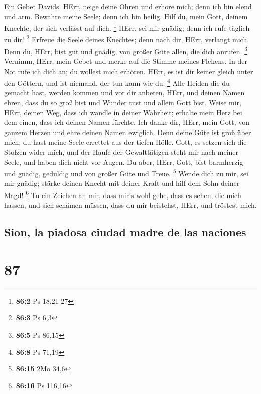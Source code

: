  Ein Gebet Davids. HErr, neige deine Ohren und erhöre
mich; denn ich bin elend und arm.  Bewahre meine Seele;
denn ich bin heilig. Hilf du, mein Gott, deinem Knechte, der sich
verlässt auf dich. \footnote{\textbf{86:2} Ps 18,21-27} 
HErr, sei mir gnädig; denn ich rufe täglich zu dir! \footnote{\textbf{86:3}
  Ps 6,3}  Erfreue die Seele deines Knechtes; denn nach
dir, HErr, verlangt mich.  Denn du, HErr, bist gut und
gnädig, von großer Güte allen, die dich anrufen. \footnote{\textbf{86:5}
  Ps 86,15}  Vernimm, HErr, mein Gebet und merke auf die
Stimme meines Flehens.  In der Not rufe ich dich an; du
wollest mich erhören.  HErr, es ist dir keiner gleich
unter den Göttern, und ist niemand, der tun kann wie du. \footnote{\textbf{86:8}
  Ps 71,19}  Alle Heiden die du gemacht hast, werden
kommen und vor dir anbeten, HErr, und deinen Namen ehren,
 dass du so groß bist und Wunder tust und allein Gott
bist.  Weise mir, HErr, deinen Weg, dass ich wandle in
deiner Wahrheit; erhalte mein Herz bei dem einen, dass ich deinen Namen
fürchte.  Ich danke dir, HErr, mein Gott, von ganzem
Herzen und ehre deinen Namen ewiglich.  Denn deine Güte
ist groß über mich; du hast meine Seele errettet aus der tiefen Hölle.
 Gott, es setzen sich die Stolzen wider mich, und der
Haufe der Gewalttätigen steht mir nach meiner Seele, und haben dich
nicht vor Augen.  Du aber, HErr, Gott, bist barmherzig
und gnädig, geduldig und von großer Güte und Treue. \footnote{\textbf{86:15}
  2Mo 34,6}  Wende dich zu mir, sei mir gnädig; stärke
deinen Knecht mit deiner Kraft und hilf dem Sohn deiner Magd!
\footnote{\textbf{86:16} Ps 116,16}  Tu ein Zeichen an
mir, dass mir's wohl gehe, dass es sehen, die mich hassen, und sich
schämen müssen, dass du mir beistehst, HErr, und tröstest mich.

\hypertarget{sion-la-piadosa-ciudad-madre-de-las-naciones}{%
\subsection{Sion, la piadosa ciudad madre de las
naciones}\label{sion-la-piadosa-ciudad-madre-de-las-naciones}}

\hypertarget{section-86}{%
\section{87}\label{section-86}}

